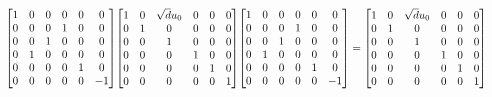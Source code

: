 \documentclass[11pt]{article}
\theoremstyle{definition}
\begin{document}
\[
\scaletoalign{\textwidth}{{\left[\begin{matrix}1 & 0 & 0 & 0 & 0 & 0\\0 & 0 & 0 & 1 & 0 & 0\\0 & 0 & 1 & 0 & 0 & 0\\0 & 1 & 0 & 0 & 0 & 0\\0 & 0 & 0 & 0 & 1 & 0\\0 & 0 & 0 & 0 & 0 & -1\end{matrix}\right]} {\left[\begin{matrix}1 & 0 & \sqrt{d} u_{0} & 0 & 0 & 0\\0 & 1 & 0 & 0 & 0 & 0\\0 & 0 & 1 & 0 & 0 & 0\\0 & 0 & 0 & 1 & 0 & 0\\0 & 0 & 0 & 0 & 1 & 0\\0 & 0 & 0 & 0 & 0 & 1\end{matrix}\right]} {\left[\begin{matrix}1 & 0 & 0 & 0 & 0 & 0\\0 & 0 & 0 & 1 & 0 & 0\\0 & 0 & 1 & 0 & 0 & 0\\0 & 1 & 0 & 0 & 0 & 0\\0 & 0 & 0 & 0 & 1 & 0\\0 & 0 & 0 & 0 & 0 & -1\end{matrix}\right]} = {\left[\begin{matrix}1 & 0 & \sqrt{d} u_{0} & 0 & 0 & 0\\0 & 1 & 0 & 0 & 0 & 0\\0 & 0 & 1 & 0 & 0 & 0\\0 & 0 & 0 & 1 & 0 & 0\\0 & 0 & 0 & 0 & 1 & 0\\0 & 0 & 0 & 0 & 0 & 1\end{matrix}\right]}}
\]
\end{document}
